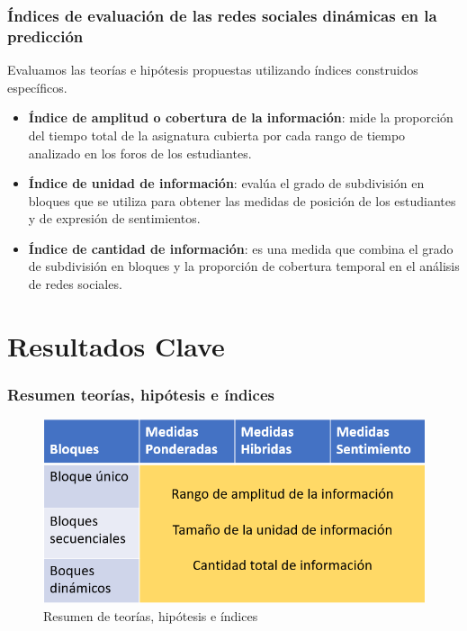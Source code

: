 \documentclass{beamer}
\begin{document}
\begin{frame}
	\frametitle{Índices de evaluación de las redes sociales dinámicas en la predicción}
	\begin{block}{Evaluamos las teorías e hipótesis propuestas utilizando índices construidos específicos.}
	\begin{itemize}
		\item \textbf{Índice de amplitud o cobertura de la información}: mide la proporción del tiempo total de la asignatura cubierta por cada rango de tiempo analizado en los foros de los estudiantes.
		\item \textbf{Índice de unidad de información}: evalúa el grado de subdivisión en bloques que se utiliza para obtener las medidas de posición de los estudiantes y de expresión de sentimientos.
		\item \textbf{Índice de cantidad de información}: es una medida que combina el grado de subdivisión en bloques y la proporción de cobertura temporal en el análisis de redes sociales.
	\end{itemize}
	\end{block}
\end{frame}



\section{Resultados Clave}

\begin{frame}
	\frametitle{Resumen teorías, hipótesis e índices}
	
	\begin{figure}[H]
		\centering
		\includegraphics[width=0.9\linewidth]{figs/imagen23}
		\caption{Resumen de teorías, hipótesis e índices}
		\label{fig:imagen23}
	\end{figure}
\end{frame}
\end{document}

